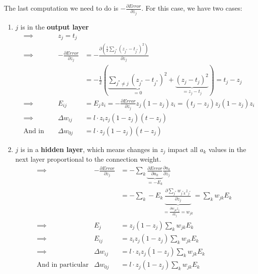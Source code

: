 The last computation we need to do is $-\frac{\partial Error}{\partial z_j}$. For this case, we have two cases:
\begin{enumerate}
  \item $j$ is in the \textbf{output layer}
  \begin{align*}
    &\implies & z_j = t_j\\
    &\implies & -\frac{\partial Error}{\partial z_j} &= -\frac{\partial \left( \frac{1}{2}\sum_{j^*} (z_{j^*} - t_{j^*})^2 \right)}{\partial z_j}\\
    &&& = - \frac{1}{2}\left( \underbrace{\sum_{j^*\neq j}(z_{j^*} - t_{j^*})^2}_{=0} + \underbrace{(z_{j} - t_{j})^2}_{=z_j - t_j} \right) = t_j - z_j\\
    &\implies & E_{ij} &= E_j z_i = -\frac{\partial Error}{\partial z_j} z_j (1-z_j) z_i = (t_j - z_j)  z_j (1-z_j) z_i \\
    &\implies & \Delta w_{ij} &= l\cdot z_i z_j (1-z_j)(t-z_j)\\
    &\text{And in particular} & \Delta w_{0j} &= l\cdot z_j (1-z_j)(t-z_j)
  \end{align*}
  \item $j$ is in a \textbf{hidden layer}, which means changes in $z_j$ impact all $a_k$ values in the next layer proportional to the connection weight.
  \begin{align*}
    &\implies & -\frac{\partial Error}{\partial z_j} &= -\sum_k \underbrace{\frac{\partial Error}{\partial a_k}}_{=-E_k} \frac{\partial a_k}{\partial z_j}\\
              &&& = -\sum_k -E_k \underbrace{\frac{\partial \sum_{j^*} w_{j^* k}z_{j^*}}{\partial z_j}}_{=\frac{\partial w_{jk}z_j}{\partial z_j} = w_{jk}}  = \sum_k w_{jk}E_k\\
    &\implies & E_j &= z_j (1-z_j)\sum_k w_{jk}E_k\\
    &\implies & E_{ij} &= z_i z_j (1-z_j)\sum_k w_{jk}E_k\\
    &\implies & \Delta w_{ij} &= l\cdot z_i z_j (1-z_j)\sum_k w_{jk}E_k\\
    &\text{And in particular} & \Delta w_{0j} &= l\cdot z_j (1-z_j)\sum_k w_{jk}E_k
  \end{align*}
\end{enumerate}


